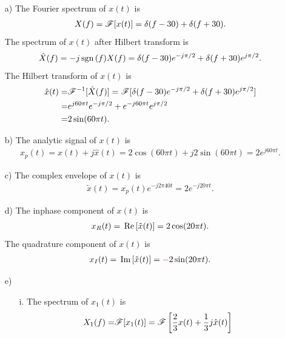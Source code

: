 \documentclass{assignment}
\begin{document}
\begin{sol}
    \begin{itemize}
        \item[a)] The Fourier spectrum of $x(t)$ is
        \begin{align}
            \notag X(f)=\mathscr{F}[x(t)]=\delta(f-30)+\delta(f+30).
        \end{align}
        The spectrum of $x(t)$ after Hilbert transform is
        \begin{align}
            \hat{X}(f)=-j\,\text{sgn}\,(f)X(f)=\delta(f-30)e^{-j\pi/2}+\delta(f+30)e^{j\pi/2}.
        \end{align}
        The Hilbert transform of $x(t)$ is
        \begin{align}
            \notag\hat{x}(t)=&\mathscr{F}^{-1}[\hat{X}(f)]=\mathscr{F}[\delta(f-30)e^{-j\pi/2}+\delta(f+30)e^{j\pi/2}]\\
            \notag=&e^{j60\pi t}e^{-j\pi/2}+e^{-j60\pi t}e^{j\pi/2}\\
            =&2\sin(60\pi t).
        \end{align}
        \item[b)] The analytic signal of $x(t)$ is
        \begin{align}
            x_p(t)=x(t)+j\hat{x}(t)=2\cos(60\pi t)+j2\sin(60\pi t)=2e^{j60\pi t}.
        \end{align}
        \item[c)] The complex envelope of $x(t)$ is
        \begin{align}
            \tilde{x}(t)=x_p(t)e^{-j2\pi 40t}=2e^{-j20\pi t}.
        \end{align}
        \item[d)] The inphase component of $x(t)$ is
        \begin{align}
            x_R(t)=\,\text{Re}\,[\tilde{x}(t)]=2\cos(20\pi t).
        \end{align}
        The quadrature component of $x(t)$ is
        \begin{align}
            x_I(t)=\,\text{Im}\,[\tilde{x}(t)]={\color{red}-}2\sin(20\pi t).
        \end{align}
        \item[e)] 
        \begin{itemize}
            \item[i.] The spectrum of $x_1(t)$ is
            \begin{align}
                \notag X_1(f)=&\mathscr{F}[x_1(t)]=\mathscr{F}\left[\frac{2}{3}x(t)+\frac{1}{3}j\hat{x}(t)\right]\\

\end{align}
\end{itemize}
\end{itemize}
\end{sol}
\end{document}
